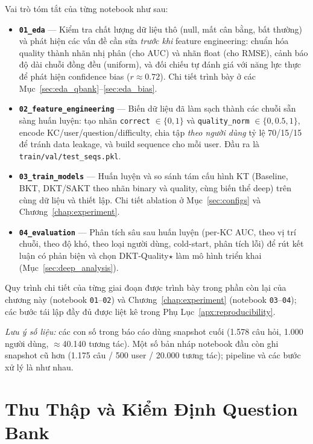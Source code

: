 \documentclass[12pt, a4paper]{report}
\begin{document}
Vai trò tóm tắt của từng notebook như sau:

\begin{itemize}
  \item \textbf{\texttt{01\_eda}} --- Kiểm tra chất lượng dữ liệu thô (null, mất cân bằng, bất thường) và phát hiện các vấn đề cần sửa \emph{trước khi} feature engineering: chuẩn hóa quality thành nhãn nhị phân (cho AUC) và nhãn float (cho RMSE), cảnh báo độ dài chuỗi đồng đều (uniform), và đối chiếu tự đánh giá với năng lực thực để phát hiện confidence bias ($r \approx 0.72$). Chi tiết trình bày ở các Mục~\ref{sec:eda_qbank}--\ref{sec:eda_bias}.
  \item \textbf{\texttt{02\_feature\_engineering}} --- Biến dữ liệu đã làm sạch thành các chuỗi sẵn sàng huấn luyện: tạo nhãn \texttt{correct} $\in\{0,1\}$ và \texttt{quality\_norm} $\in\{0,0.5,1\}$, encode KC/user/question/difficulty, chia tập \emph{theo người dùng} tỷ lệ 70/15/15 để tránh data leakage, và build sequence cho mỗi user. Đầu ra là \texttt{train/val/test\_seqs.pkl}.
  \item \textbf{\texttt{03\_train\_models}} --- Huấn luyện và so sánh tám cấu hình KT (Baseline, BKT, DKT/SAKT theo nhãn binary và quality, cùng biến thể deep) trên cùng dữ liệu và thiết lập. Chi tiết ablation ở Mục~\ref{sec:configs} và Chương~\ref{chap:experiment}.
  \item \textbf{\texttt{04\_evaluation}} --- Phân tích sâu sau huấn luyện (per-KC AUC, theo vị trí chuỗi, theo độ khó, theo loại người dùng, cold-start, phân tích lỗi) để rút kết luận có phản biện và chọn DKT-Quality$\star$ làm mô hình triển khai (Mục~\ref{sec:deep_analysis}).
\end{itemize}

Quy trình chi tiết của từng giai đoạn được trình bày trong phần còn lại của chương này (notebook \texttt{01}--\texttt{02}) và Chương~\ref{chap:experiment} (notebook \texttt{03}--\texttt{04}); các bước tái lập đầy đủ được liệt kê trong Phụ Lục~\ref{apx:reproducibility}.

\medskip
\noindent\textit{Lưu ý số liệu:} các con số trong báo cáo dùng snapshot cuối (1.578 câu hỏi, 1.000 người dùng, $\approx$40.140 tương tác). Một số bản nháp notebook đầu còn ghi snapshot cũ hơn (1.175 câu / 500 user / 20.000 tương tác); pipeline và các bước xử lý là như nhau.

\section{Thu Thập và Kiểm Định Question Bank}
\label{sec:qbank_build}
\end{document}
